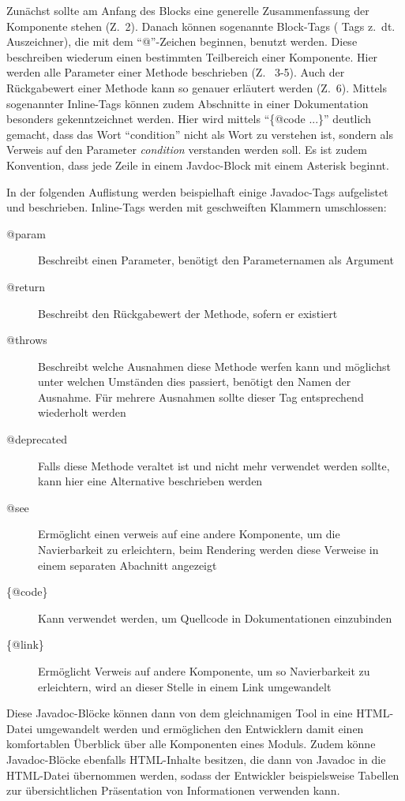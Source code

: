 Zunächst sollte am Anfang des Blocks eine generelle Zusammenfassung der Komponente stehen  (Z.~2). Danach können sogenannte Block-Tags ( Tags z.~dt. Auszeichner), die mit dem \enquote{@}-Zeichen beginnen, benutzt werden. Diese beschreiben wiederum einen bestimmten Teilbereich einer Komponente. Hier werden alle Parameter einer Methode beschrieben (Z.~ 3-5). Auch der Rückgabewert einer Methode kann so genauer erläutert werden (Z.~6). Mittels sogenannter Inline-Tags können zudem Abschnitte in einer Dokumentation besonders gekenntzeichnet werden. Hier wird mittels \enquote{\{@code ...\}} deutlich gemacht, dass das Wort \enquote{condition} nicht als Wort zu verstehen ist, sondern als Verweis auf den Parameter \textit{condition} verstanden werden soll. Es ist zudem Konvention, dass jede Zeile in einem Javdoc-Block mit einem Asterisk beginnt. 

In der folgenden Auflistung werden beispielhaft einige Javadoc-Tags aufgelistet und beschrieben. Inline-Tags werden mit geschweiften Klammern umschlossen:
\begin{description}
         \item[@param]  Beschreibt einen Parameter, benötigt den Parameternamen als Argument
         \item[@return]  Beschreibt den Rückgabewert der Methode, sofern er existiert 
         \item[@throws] Beschreibt welche Ausnahmen diese Methode werfen kann und möglichst unter welchen Umständen dies passiert, benötigt den Namen der Ausnahme. Für mehrere Ausnahmen sollte dieser Tag entsprechend wiederholt werden 
         \item[@deprecated] Falls diese Methode veraltet ist und nicht mehr verwendet werden sollte, kann hier eine Alternative beschrieben werden
         \item[@see] Ermöglicht einen verweis auf eine andere Komponente, um die Navierbarkeit zu erleichtern, beim Rendering werden diese Verweise in einem separaten Abachnitt angezeigt
         \item[\{@code\}] Kann verwendet werden, um Quellcode in Dokumentationen einzubinden
         \item [\{@link\}] Ermöglicht Verweis auf andere Komponente, um so Navierbarkeit zu erleichtern, wird an dieser Stelle in einem Link umgewandelt
        
\end{description}



Diese Javadoc-Blöcke können dann von dem gleichnamigen Tool in eine \ac{HTML}-Datei umgewandelt werden und ermöglichen den Entwicklern damit einen komfortablen Überblick über alle Komponenten eines Moduls. Zudem könne Javadoc-Blöcke ebenfalls \ac{HTML}-Inhalte besitzen, die dann von Javadoc in die \ac{HTML}-Datei übernommen werden, sodass der Entwickler beispielsweise Tabellen zur übersichtlichen Präsentation  von Informationen verwenden kann. 

